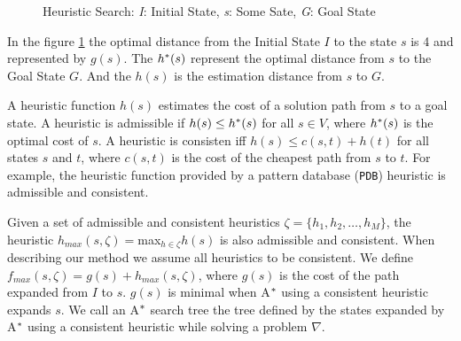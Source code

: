 \begin{figure}[htb]
\centering
{}
\caption{Heuristic Search: \textit{I}: Initial State, \textit{s}: Some Sate, \textit{G}: Goal State} \label{fig:searchSpace}
\end{figure}

In the figure \ref{fig:searchSpace} the optimal distance from the Initial State $I$ to  the state $s$ is 4 and represented by $g(s)$. The $h\sp{*}(s)$ represent the optimal distance from $s$ to the Goal State $G$. And the $h(s)$ is the estimation distance from $s$ to $G$.

A heuristic function $h(s)$ estimates the cost of a solution path from $s$ to a goal state. A heuristic is admissible if $h(s) \leq h\sp{*}(s)$ for all $s \in V$, where $h\sp{*}(s)$ is the optimal cost of $s$. A heuristic is consisten iff $h(s) \leq c(s,t) + h(t)$ for all states $s$ and $t$, where $c(s,t)$ is the cost of the cheapest path from $s$ to $t$. For example, the heuristic function provided by a pattern database (\texttt{PDB}) heuristic \cite{culberson1998pattern} is admissible and consistent.

Given a set of admissible and consistent heuristics $\zeta = \{h_{1}, h_{2}, \dots, h_{M}\}$, the heuristic $h_{max}(s,\zeta) = $max$_{h \in \zeta} h(s)$ is also admissible and consistent. When describing our method we assume all heuristics to be consistent. We define $f_{max}(s, \zeta) = g(s) + h_{max}(s, \zeta)$, where $g(s)$ is the cost of the path expanded from $I$ to $s$. $g(s)$ is minimal when A$\sp{*}$ using a consistent heuristic expands $s$. We call an A$\sp{*}$ search tree the tree defined by the states expanded by A$\sp{*}$ using a consistent heuristic while solving a problem $\nabla$.

